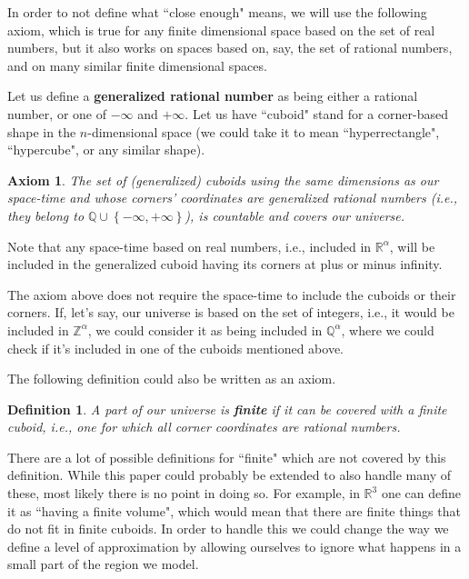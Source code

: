\documentclass[a4paper
,draft
]{article}
\def\reale{\mathbb{R}}
\def\intregi{\mathbb{Z}}
\def\rationale{\mathbb{Q}}
\newcommand{\multime}[1]{\left\{ #1 \right\}}
\newcommand{\definitie}[1]{\textbf{#1}}
\newcommand{\ghilimele}[1]{``#1"}
\newtheorem{definition}{Definition}
\newtheorem{axiom}{Axiom}
\begin{document}
In order to not define what \ghilimele{close enough} means, we will use
the following axiom, which is true for any finite dimensional space
based on the set of real numbers, but it also works on spaces based on,
say, the set of rational numbers, and on many similar finite dimensional spaces.

Let us define a \definitie{generalized rational number} as being either a
rational number, or one of $-\infty$ and $+\infty$. Let us have
\ghilimele{cuboid} stand for a corner-based shape in the $n$-dimensional space
(we could take it to mean \ghilimele{hyperrectangle}, \ghilimele{hypercube},
or any similar shape).

\begin{axiom}\label{ax:rationalcovering}
  The set of (generalized) cuboids using the same dimensions as our space-time
  and whose corners' coordinates are generalized rational numbers (i.e., they
  belong to $\rationale\cup\multime{-\infty, +\infty}$),
  is countable and covers our universe.
\end{axiom}

Note that any space-time based on real numbers, i.e., included
in $\reale^\alpha$, will be included in the generalized cuboid having
its corners at plus or minus infinity.

The axiom above does not require the space-time to include the cuboids or
their corners.
If, let's say, our universe is based on the set of integers, i.e.,
it would be included in $\intregi^\alpha$,
we could consider it as being included in $\rationale^\alpha$,
where we could check if it's included in one of the cuboids mentioned
above.

The following definition could also be written as an axiom.

\begin{definition}\label{finitecuboid}
  A part of our universe is \definitie{finite} if
  it can be covered with a finite cuboid, i.e., one
  for which all corner coordinates are rational numbers.
\end{definition}

There are a lot of possible definitions for \ghilimele{finite} which are not
covered by this definition.
While this paper could probably be extended to also handle many of these,
most likely there is no point in doing so.
For example, in $\reale^3$ one can define it as
\ghilimele{having a finite volume}, which would
mean that there are finite things that do not fit in finite cuboids.
In order to handle this we could change the way we define a level of approximation
by allowing ourselves to ignore what happens in a small part of the region we model.
\end{document}
